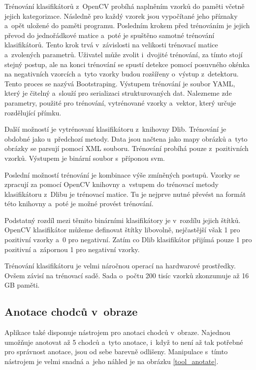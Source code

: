 Trénování klasifikátorů z~OpenCV probíhá naplněním vzorků do paměti včetně jejich kategorizace. Následně pro každý vzorek jsou vypočítané jeho příznaky a~opět uložené do paměti programu. Posledním krokem před trénováním je jejich převod do jednořádkové matice a~poté je spuštěno samotné trénování klasifikátorů. Tento krok trvá v~závislosti na velikosti trénovací matice a~zvolených parametrů. Uživatel může zvolit i~dvojité trénování, za tímto stojí stejný postup, ale na konci trénování se spustí detekce pomocí posuvného okénka na negativních vzorcích a~tyto vzorky budou rozšířeny o~výstup z~detektoru. Tento proces se nazývá Bootstraping. Výstupem trénování je soubor YAML, který je čitelný a~slouží pro serializaci strukturovaných dat. Nalezneme zde parametry, použité pro trénování, vytrénované vzorky a~vektor, který určuje rozdělující přímku.

Další možností je vytrénovaní klasifikátoru z~knihovny Dlib. Trénování je obdobné jako u~předchozí metody. Data jsou načtena jako mapy obrázků a~tyto obrázky se parsují pomocí XML souboru. Trénování probíhá pouze z~pozitivních vzorků. Výstupem je binární soubor s~příponou svm.

Poslední možností trénování je kombinace výše zmíněných postupů. Vzorky se zpracují za pomocí OpenCV knihovny a~vstupem do trénovací metody klasifikátoru z~Dlibu je trénovací matice. Tu je nejprve nutné převést na formát této knihovny a~poté je možné provést trénování.

Podstatný rozdíl mezi těmito binárními klasifikátory je v~rozdílu jejich štítků. OpenCV klasifikátor můžeme definovat štítky libovolně, nejčastější však 1 pro pozitivní vzorky a~0 pro negativní. Zatím co Dlib klasifikátor přijímá pouze 1 pro pozitivní a~zápornou 1 pro negativní vzorky.

Trénování klasifikátoru je velmi náročnou  operací na hardwarové prostředky. Ovšem závisí na trénovací sadě. Sada o~počtu 200 tisíc vzorků zkonzumuje až 16 GB paměti.

\subsection{Anotace chodců v~obraze}
Aplikace také disponuje nástrojem pro anotaci chodců v~obraze. Najednou umožňuje anotovat až 5 chodců a~tyto anotace, i~když to není až tak potřebné pro správnost anotace, jsou od sebe barevně odlišeny. Manipulace s~tímto nástrojem je velmi snadná a~jeho náhled je na obrázku \ref{tool_anotate}.

